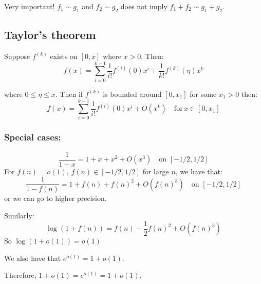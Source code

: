 \documentclass[]{article}
\theoremstyle{definition}
\numberwithin{theorem}{section}
\numberwithin{equation}{section}
\begin{document}
Very important! $f_1 \sim g_1$ and $f_2 \sim g_2$ does not imply $f_1 + f_2 \sim g_1 + g_2$. 
\subsection{Taylor's theorem}
Suppose $f^{(k)}$ exists on $[0, x]$ where $x > 0$. Then:
\begin{equation}
	f(x) = \sum_{i = 0}^{k - 1} \frac{1}{i!}f^{(i)}(0) x^i + \frac{1}{k!} f^{(k)}(\eta) x^k
\end{equation}

where $0 \leq \eta \leq x$. Then if $f^(k)$ is bounded around $[0, x_1]$ for some $x_1 > 0$ then:
\begin{equation}
	f(x) = \sum_{i = 0}^{k - 1} \frac{1}{i!}f^{(i)}(0) x^i + O(x^k) \quad \text{for} \, x \in [0, x_1]
\end{equation}

\subsubsection{Special cases:}

\begin{equation}
	\frac{1}{1-x} = 1 + x + x^2 + O(x^3) \quad \text{on } [-1/2, 1/2]
\end{equation}
For $f(n) = o(1)$, $f(n) \in [-1/2, 1/2]$ for large $n$, we have that:
\begin{equation}
	\frac{1}{1-f(n)} = 1 + f(n) + f(n)^2 + O(f(n)^3) \quad \text{on } [-1/2, 1/2]
\end{equation}
or we can go to higher precision. 

Similarly:
\begin{equation}
	\log( 1 + f(n)) = f(n) - \frac{1}{2} f(n)^2 + O(f(n)^3)
\end{equation}
So $\log(1 + o(1)) = o(1)$

We also have that $e^{o(1)} = 1 + o(1)$. 

Therefore, $1 + o(1) = e^{o(1)} = 1 + o(1)$. 
\end{document}
